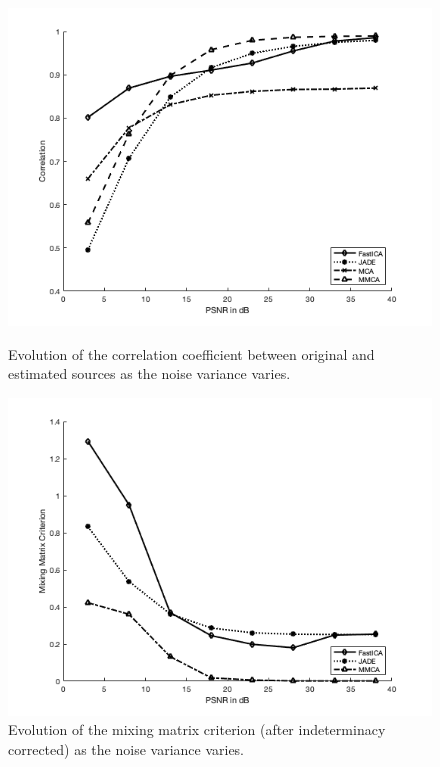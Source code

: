 \begin{figure}[!tbp]
\centering
\begin{minipage}[b]{0.49\textwidth}
\includegraphics[width=\textwidth]{images/corr_plot_seg.png}
\caption{Evolution of the correlation coefficient between original and estimated sources as the noise variance varies.}
\label{segmen_1}
\end{minipage}
\begin{minipage}[b]{0.49\textwidth}
\includegraphics[width=\textwidth]{images/mmc_plot_seg.png}
\caption{Evolution of the mixing matrix criterion (after indeterminacy corrected) as the noise variance varies.}
\end{minipage}
\label{segmen_2}
\label{imapint1}
\end{figure}

